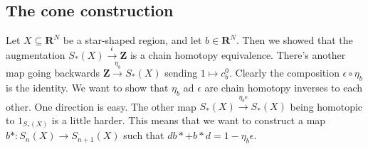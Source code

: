 \documentclass{amsart}
\theoremstyle{theorem}
\theoremstyle{definition}
\newcommand{\Z}{\mathbf Z}
\begin{document}
\subsection{The cone construction}
Let $X\subseteq \mathbf{R}^N$ be a star-shaped region, and let $b\in\mathbf{R}^N$. Then we showed that the augmentation $S_\ast(X)\xrightarrow{\epsilon}\Z$ is a chain homotopy equivalence. There's another map going backwards $\Z\xrightarrow{\eta_b} S_\ast(X)$ sending $1\mapsto c^0_b$. Clearly the composition $\epsilon\circ\eta_b$ is the identity. We want to show that $\eta_b$ ad $\epsilon$ are chain homotopy inverses to each other. One direction is easy. The other map $S_\ast(X)\xrightarrow{\eta_b\epsilon}S_\ast(X)$ being homotopic to $1_{S_\ast(X)}$ is a little harder. This means that we want to construct a map $b\ast:S_n(X)\to S_{n+1}(X)$ such that $db\ast+b\ast d=1-\eta_b\epsilon$.
\end{document}
